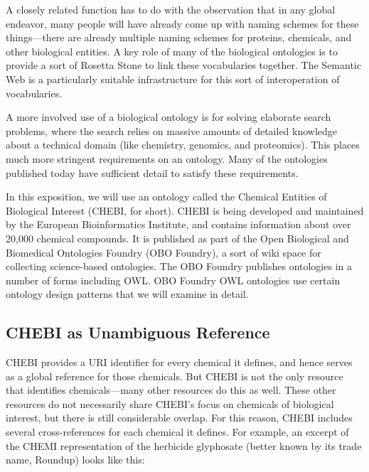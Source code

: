 A closely related function has to do with the observation that in any
global endeavor, many people will have already come up with naming
schemes for these things---there are already multiple naming schemes for
proteins, chemicals, and other biological entities. A key role of many
of the biological ontologies is to provide a sort of Rosetta Stone to
link these vocabularies together. The Semantic Web is a particularly
suitable infrastructure for this sort of interoperation of vocabularies.

A more involved use of a biological ontology is for solving elaborate
search problems, where the search relies on massive amounts of detailed
knowledge about a technical domain (like chemistry, genomics, and
proteomics). This places much more stringent requirements on an
ontology. Many of the ontologies published today have sufficient detail
to satisfy these requirements.

In this exposition, we will use an ontology called the Chemical Entities
of Biological Interest (CHEBI, for short). CHEBI is being developed and
maintained by the European Bioinformatics Institute, and contains
information about over 20,000 chemical compounds. It is published as
part of the Open Biological and Biomedical Ontologies Foundry (OBO
Foundry), a sort of wiki space for collecting science-based ontologies.
The OBO Foundry publishes ontologies in a number of forms including OWL.
OBO Foundry OWL ontologies use certain ontology design patterns that we
will examine in detail.

\subsection{CHEBI as Unambiguous Reference}

CHEBI provides a URI identifier for every chemical it defines, and hence
serves as a global reference for those chemicals. But CHEBI is not the
only resource that identifies chemicals---many other
resources do this as well. These other resources do not necessarily
share CHEBI's focus on chemicals of biological interest, but there is
still considerable overlap. For this reason, CHEBI includes several
cross-references for each chemical it defines. For example, an excerpt of the 
CHEMI representation of the
herbicide glyphosate (better known by its trade name, Roundup) looks like this: 

